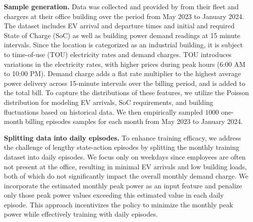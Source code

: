 {%
{\bf Sample generation.}
Data was collected and provided by \nissan{} from their fleet and chargers at their office building over the period from May 2023 to January 2024. The dataset includes EV arrival and departure times and initial and required State of Charge (SoC) as well as building power demand readings at 15 minute intervals. Since the location is categorized as an industrial building, it is subject to time-of-use (TOU) electricity rates and demand charges. TOU introduces variations in the electricity rates, with higher prices during peak hours (6:00 AM to 10:00 PM). Demand charge adds a flat rate multiplier to the highest average power delivery across 15-minute intervals over the billing period, and is added to the total bill.
To capture the distributions of these features, we utilize the Poisson distribution for modeling EV arrivals, SoC requirements, and building fluctuations based on historical data. We then empirically sampled $1000$ one-month billing episodes samples for each month from May 2023 to January 2024.  


\textbf{Splitting data into daily episodes.}
To enhance training efficacy, we address the challenge of lengthy state-action episodes by splitting the monthly training dataset into daily episodes.
We focus only on weekdays since employees are often not present at the office, resulting in minimal EV arrivals and low building loads, both of which do not significantly impact the overall monthly demand charge. We incorporate the estimated monthly peak power as an input feature and penalize only those peak power values exceeding this estimated value in each daily episode. This approach incentivizes the policy to minimize the monthly peak power while effectively training with daily episodes.

}
